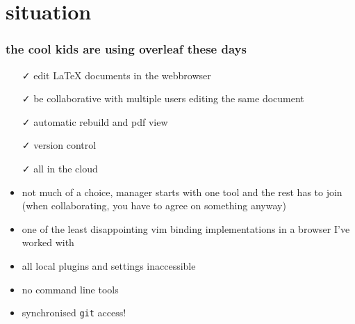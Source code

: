 \maketitle

\section{situation}
\begin{frame}
  \frametitle{the cool kids are using overleaf these days}
  \begin{itemize}
    \item[{\DejaSans ✓}] edit LaTeX documents in the webbrowser 
    \item[{\DejaSans ✓}] be collaborative with multiple users editing the same document
    \item[{\DejaSans ✓}] automatic rebuild and pdf view
    \item[{\DejaSans ✓}] version control
    \item[{\DejaSans ✓}] all in the cloud
    \item<2->[{\DejaSans ☹}] not much of a choice, manager starts with one tool and the rest has to join
      \newline (when collaborating, you have to agree on something anyway)
    \item<2->[{\DejaSans ☺}] one of the least disappointing vim binding implementations in a browser I've worked with
    \item<2->[{\DejaSans ☹}] all local plugins and settings inaccessible
    \item<2->[{\DejaSans ☹}] no command line tools
    \item<3->[{\DejaSans 😃}] synchronised \texttt{git} access!
  \end{itemize}
\end{frame}

